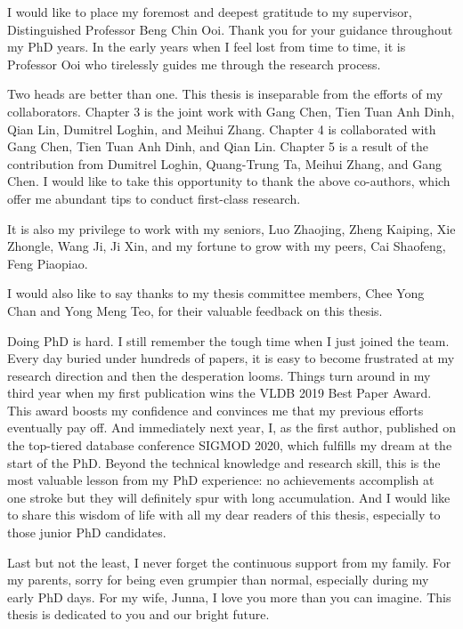 \begin{acknowledgments}

I would like to place my foremost and deepest gratitude to my supervisor, Distinguished Professor Beng Chin Ooi. 
Thank you for your guidance throughout my PhD years. 
In the early years when I feel lost from time to time, it is Professor Ooi who tirelessly guides me through the research process. 

Two heads are better than one. This thesis is inseparable from the efforts of my collaborators. 
Chapter 3 is the joint work with Gang Chen, Tien Tuan Anh Dinh, Qian Lin, Dumitrel Loghin, and Meihui Zhang. 
Chapter 4 is collaborated with Gang Chen, Tien Tuan Anh Dinh, and Qian Lin. 
Chapter 5 is a result of the contribution from Dumitrel Loghin, Quang-Trung Ta, Meihui Zhang, and Gang Chen.
I would like to take this opportunity to thank the above co-authors, which offer me abundant tips to conduct first-class research. 

It is also my privilege to work with my seniors, Luo Zhaojing, Zheng Kaiping, Xie Zhongle, Wang Ji, Ji Xin, and my fortune to grow with my peers, Cai Shaofeng, Feng Piaopiao. 

I would also like to say thanks to my thesis committee members, Chee Yong Chan and Yong Meng Teo, for their valuable feedback on this thesis. 

Doing PhD is hard. I still remember the tough time when I just joined the team. Every day buried under hundreds of papers, it is easy to become frustrated at my research direction and then the desperation looms. 
Things turn around in my third year when my first publication wins the VLDB 2019 Best Paper Award. This award boosts my confidence and convinces me that my previous efforts eventually pay off. 
And immediately next year, I, as the first author, published on the top-tiered database conference SIGMOD 2020, which fulfills my dream at the start of the PhD. 
Beyond the technical knowledge and research skill, this is the most valuable lesson from my PhD experience: no achievements accomplish at one stroke but they will definitely spur with long accumulation.  
And I would like to share this wisdom of life with all my dear readers of this thesis, especially to those junior PhD candidates. 

Last but not the least, I never forget the continuous support from my family. For my parents, sorry for being even grumpier than normal, especially during my early PhD days. For my wife, Junna, I love you more than you can imagine. This thesis is dedicated to you and our bright future. 
    

\end{acknowledgments}
